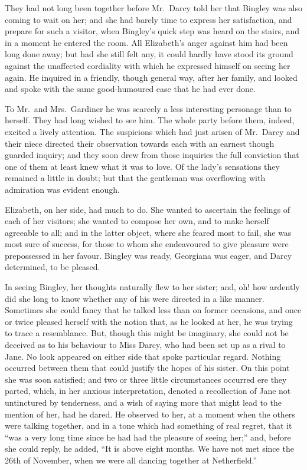 They had not long been together before Mr.\ Darcy told her that
Bingley was also coming to wait on her; and she had barely time
to express her satisfaction, and prepare for such a visitor, when
Bingley's quick step was heard on the stairs, and in a moment he
entered the room.  All Elizabeth's anger against him had been
long done away; but had she still felt any, it could hardly have
stood its ground against the unaffected cordiality with which he
expressed himself on seeing her again.  He inquired in a friendly,
though general way, after her family, and looked and spoke with
the same good-humoured ease that he had ever done.

To Mr.\ and Mrs.\ Gardiner he was scarcely a less interesting
personage than to herself.  They had long wished to see him.
The whole party before them, indeed, excited a lively attention.
The suspicions which had just arisen of Mr.\ Darcy and their niece
directed their observation towards each with an earnest though
guarded inquiry; and they soon drew from those inquiries the full
conviction that one of them at least knew what it was to love.
Of the lady's sensations they remained a little in doubt; but that
the gentleman was overflowing with admiration was evident enough.

Elizabeth, on her side, had much to do.  She wanted to
ascertain the feelings of each of her visitors; she wanted to
compose her own, and to make herself agreeable to all; and in
the latter object, where she feared most to fail, she was most
sure of success, for those to whom she endeavoured to give
pleasure were prepossessed in her favour.  Bingley was ready,
Georgiana was eager, and Darcy determined, to be pleased.

In seeing Bingley, her thoughts naturally flew to her sister;
and, oh! how ardently did she long to know whether any of his were
directed in a like manner.  Sometimes she could fancy that he
talked less than on former occasions, and once or twice pleased
herself with the notion that, as he looked at her, he was trying
to trace a resemblance.  But, though this might be imaginary,
she could not be deceived as to his behaviour to Miss Darcy, who
had been set up as a rival to Jane.  No look appeared on either
side that spoke particular regard.  Nothing occurred between
them that could justify the hopes of his sister.  On this point
she was soon satisfied; and two or three little circumstances
occurred ere they parted, which, in her anxious interpretation,
denoted a recollection of Jane not untinctured by tenderness,
and a wish of saying more that might lead to the mention of her,
had he dared.  He observed to her, at a moment when the others
were talking together, and in a tone which had something of real
regret, that it ``was a very long time since he had had the
pleasure of seeing her;'' and, before she could reply, he added,
``It is above eight months.  We have not met since the 26th of
November, when we were all dancing together at Netherfield.''


